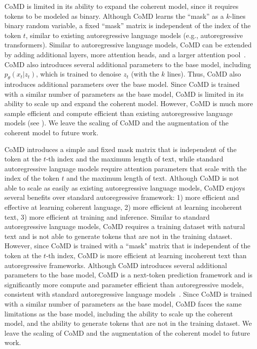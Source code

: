 CoMD is limited in its ability to expand the coherent model, since it requires tokens to be modeled as binary. Although CoMD learns the ``mask” as a $k$-lines binary random variable, a fixed ``mask” matrix is independent of the index of the token $t$, similar to existing autoregressive language models (e.g., autoregressive transformers). Similar to autoregressive language models, CoMD can be extended by adding additional layers, more attention heads, and a larger attention pool~\citep{ruder2017overview}. CoMD also introduces several additional parameters to the base model, including $p_\theta(x_t|z_t)$, which is trained to denoise $z_t$ (with the $k$ lines). Thus, CoMD also introduces additional parameters over the base model. Since CoMD is trained with a similar number of parameters as the base model, CoMD is limited in its ability to scale up and expand the coherent model. However, CoMD is much more sample efficient and compute efficient than existing autoregressive language models (see \citet{tripuraneni2022provablem,hoffmann2022trainingcomputeoptimalallarguement}). We leave the scaling of CoMD and the augmentation of the coherent model to future work. 

CoMD introduces a simple and fixed mask matrix that is independent of the token at the $t$-th index and the maximum length of text, while standard autoregressive language models require attention parameters that scale with the index of the token $t$ and the maximum length of text. Although CoMD is not able to scale as easily as existing autoregressive language models, CoMD enjoys several benefits over standard autoregressive framework: 1) more efficient and effective at learning coherent language, 2) more efficient at learning incoherent text, 3) more efficient at training and inference. Similar to standard autoregressive language models, CoMD requires a training dataset with natural text and is not able to generate tokens that are not in the training dataset. However, since CoMD is trained with a ``mask" matrix that is independent of the token at the $t$-th index, CoMD is more efficient at learning incoherent text than autoregressive frameworks. Although CoMD introduces several additional parameters to the base model, CoMD is a next-token prediction framework and is significantly more compute and parameter efficient than autoregressive models, consistent with standard autoregressive language models~\citep{ruder2017overview}. Since CoMD is trained with a similar number of parameters as the base model, CoMD faces the same limitations as the base model, including the ability to scale up the coherent model, and the ability to generate tokens that are not in the training dataset. We leave the scaling of CoMD and the augmentation of the coherent model to future work. 

